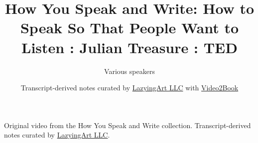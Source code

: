 \documentclass[11pt,oneside]{book}
\begin{document}
\frontmatter
\title{How You Speak and Write: How to Speak So That People Want to Listen : Julian Treasure : TED}
\author{Various speakers}
\date{Transcript-derived notes curated by \href{https://lazying.art}{LazyingArt LLC} with \href{https://github.com/lachlanchen/Video2Book}{Video2Book}}
\maketitle
\begin{center}
\small Original video from the How You Speak and Write collection. Transcript-derived notes curated by \href{https://lazying.art}{LazyingArt LLC}.
\end{center}
\clearpage
\mainmatter

\end{document}
